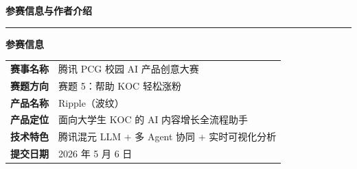 \documentclass[12pt,a4paper]{ctexart}
\begin{document}
\newpage
\thispagestyle{empty}
\vspace*{2cm}

\begin{center}
{\LARGE\bfseries\color{primary} 参赛信息与作者介绍}
\vspace{0.3cm}
\textcolor{primary}{\rule{12cm}{1.2pt}}
\end{center}

\vspace{1cm}

\begin{tcolorbox}[colback=lightbg,colframe=primary,arc=6pt,
  left=12pt,right=12pt,top=10pt,bottom=10pt]
\begin{center}
{\large\bfseries\color{primary} 参赛信息}
\end{center}
\vspace{0.3cm}

\begin{tabular}{p{3.5cm} p{10cm}}
\textbf{赛事名称} & 腾讯 PCG 校园 AI 产品创意大赛 \\[4pt]
\textbf{赛题方向} & 赛题 5：帮助 KOC 轻松涨粉 \\[4pt]
\textbf{产品名称} & Ripple（波纹）\\[4pt]
\textbf{产品定位} & 面向大学生 KOC 的 AI 内容增长全流程助手 \\[4pt]
\textbf{技术特色} & 腾讯混元 LLM + 多 Agent 协同 + 实时可视化分析 \\[4pt]
\textbf{提交日期} & 2026 年 5 月 6 日 \\
\end{tabular}
\end{tcolorbox}

\vspace{0.8cm}
\end{document}
